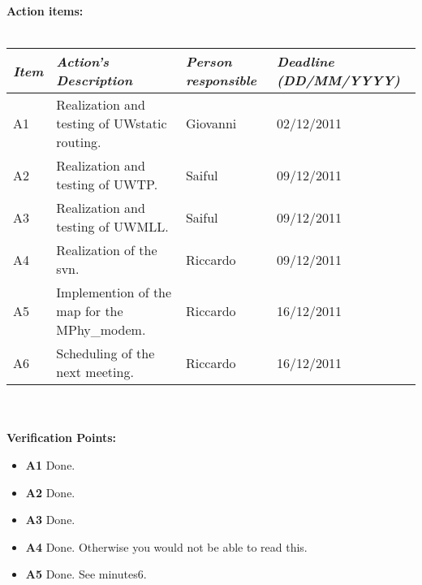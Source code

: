 \documentclass[11pt,journal,draftclsnofoot,onecolumn,twoside,letterpaper]{IEEEtran}
\theoremstyle{definition} \newtheorem{definition}[]{Definition}
\theoremstyle{theorem} \newtheorem{theorem}[]{Theorem}
\begin{document}
{\bf Action items:}\\
\ \\ 
\begin{tabular}{|p{}|p{}|p{}|p{}|}
\hline
{\it Item} & {\it Action's Description} & {\it Person responsible} & {\it Deadline (DD/MM/YYYY)}\\
\hline
A1 & Realization and testing of UWstatic routing. & Giovanni & 02/12/2011\\ 
A2 & Realization and testing of UWTP. & Saiful & 09/12/2011\\ 
A3 & Realization and testing of UWMLL. & Saiful & 09/12/2011\\ 
A4 & Realization of the svn. & Riccardo & 09/12/2011\\ 
A5 & Implemention of the map for the MPhy\_modem. & Riccardo & 16/12/2011\\
A6 & Scheduling of the next meeting. & Riccardo & 16/12/2011\\
\hline
\end{tabular}
\ \\
\ \\
{\bf Verification Points:}
\begin{itemize}
 \item {\bf A1} Done. 
 \item {\bf A2} Done. 
 \item {\bf A3} Done.
 \item {\bf A4} Done. Otherwise you would not be able to read this.
 \item {\bf A5} Done. See minutes6.
\end{itemize}
\end{document}
